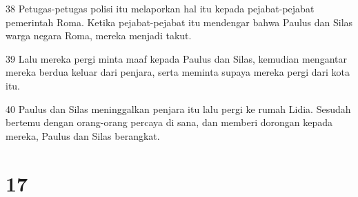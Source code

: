 \par 38 Petugas-petugas polisi itu melaporkan hal itu kepada pejabat-pejabat pemerintah Roma. Ketika pejabat-pejabat itu mendengar bahwa Paulus dan Silas warga negara Roma, mereka menjadi takut.
\par 39 Lalu mereka pergi minta maaf kepada Paulus dan Silas, kemudian mengantar mereka berdua keluar dari penjara, serta meminta supaya mereka pergi dari kota itu.
\par 40 Paulus dan Silas meninggalkan penjara itu lalu pergi ke rumah Lidia. Sesudah bertemu dengan orang-orang percaya di sana, dan memberi dorongan kepada mereka, Paulus dan Silas berangkat.

\chapter{17}

